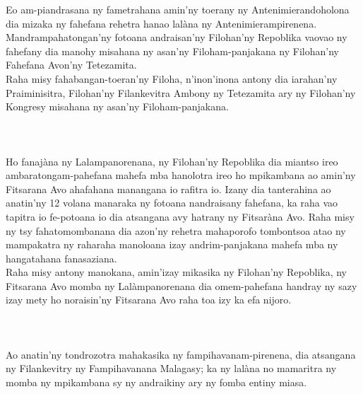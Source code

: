 \documentclass[12pt]{article}
\newcounter{laharana}
\newcommand{\andininy}[0]{
  \paragraph{%
    \NoCaseChange{%
      Andininy~\addtocounter{laharana}{1}\thelaharana.}\label{and:\thelaharana}~%
  }%
}
\begin{document}
\noindent
Eo am-piandrasana ny fametrahana amin'ny toerany ny Antenimierandoholona dia
mizaka ny fahefana rehetra hanao lalàna ny Antenimierampirenena.\\

\noindent
Mandrampahatongan'ny fotoana andraisan'ny Filohan'ny Repoblika vaovao ny
fahefany dia manohy misahana ny asan'ny Filoham-panjakana ny Filohan'ny Fahefana
Avon'ny Tetezamita.\\

\noindent
Raha misy fahabangan-toeran'ny Filoha, n'inon'inona antony dia iarahan'ny
Praiminisitra, Filohan'ny Filankevitra Ambony ny Tetezamita ary ny Filohan'ny
Kongresy misahana ny asan'ny Filoham-panjakana.

\andininy{}Ho fanajàna ny Lalampanorenana, ny Filohan'ny Repoblika dia miantso
ireo ambaratongam-pahefana mahefa mba hanolotra ireo ho mpikambana ao amin'ny
Fitsarana Avo ahafahana manangana io rafitra io. Izany dia tanterahina ao
anatin'ny 12 volana manaraka ny fotoana nandraisany fahefana, ka raha vao
tapitra io fe-potoana io dia atsangana avy hatrany ny Fitsaràna Avo. Raha misy
ny tsy fahatomombanana dia azon'ny rehetra mahaporofo tombontsoa atao ny
mampakatra ny raharaha manoloana izay andrim-panjakana mahefa mba ny hangatahana
fanasaziana.\\

\noindent
Raha misy antony manokana, amin'izay mikasika ny Filohan'ny Repoblika, ny
Fitsarana Avo momba ny Lalàmpanorenana dia omem-pahefana handray ny sazy izay
mety ho noraisin'ny Fitsarana Avo raha toa izy ka efa nijoro.

\andininy{}Ao anatin'ny tondrozotra mahakasika ny fampihavanam-pirenena, dia
atsangana ny Filankevitry ny Fampihavanana Malagasy; ka ny lalàna no mamaritra
ny momba ny mpikambana sy ny andraikiny ary ny fomba entiny miasa.
\end{document}
